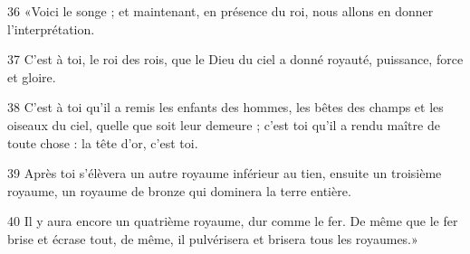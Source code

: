 
36 «Voici le songe ; et maintenant, en présence du roi, nous allons en donner l’interprétation.

37 C’est à toi, le roi des rois, que le Dieu du ciel a donné royauté, puissance, force et gloire.

38 C’est à toi qu’il a remis les enfants des hommes, les bêtes des champs et les oiseaux du ciel, quelle que soit leur demeure ; c’est toi qu’il a rendu maître de toute chose : la tête d’or, c’est toi.

39 Après toi s’élèvera un autre royaume inférieur au tien, ensuite un troisième royaume, un royaume de bronze qui dominera la terre entière.

40 Il y aura encore un quatrième royaume, dur comme le fer. De même que le fer brise et écrase tout, de même, il pulvérisera et brisera tous les royaumes.»
